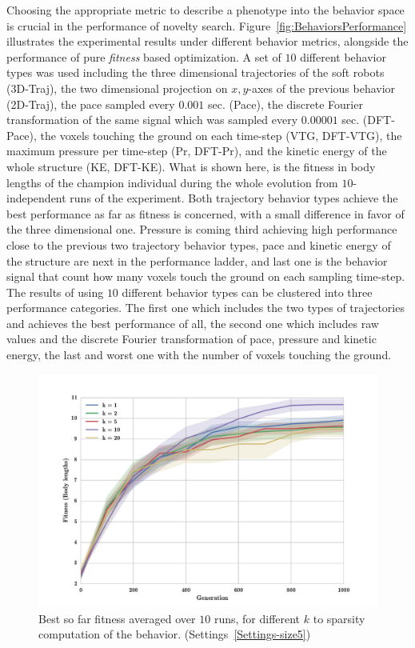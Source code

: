 Choosing the appropriate metric to describe a phenotype into the behavior space is crucial in the performance of novelty search. Figure~\ref{fig:BehaviorsPerformance} illustrates the experimental results under different behavior metrics, alongside the performance of pure \emph{fitness} based optimization. A set of $10$ different behavior types was used including the three dimensional trajectories of the soft robots (3D-Traj), the two dimensional projection on $x,y$-axes of the previous behavior (2D-Traj), the pace sampled every $0.001$ sec. (Pace), the discrete Fourier transformation of the same signal which was sampled every $0.00001$ sec. (DFT-Pace), the voxels touching the ground on each time-step (VTG, DFT-VTG), the maximum pressure per time-step (Pr, DFT-Pr), and the kinetic energy of the whole structure (KE, DFT-KE). What is shown here, is the fitness in body lengths of the champion individual during the whole evolution from $10$-independent runs of the experiment. Both trajectory behavior types achieve the best performance as far as fitness is concerned, with a small difference in favor of the three dimensional one. Pressure is coming third achieving high performance close to the previous two trajectory behavior types, pace and kinetic energy of the structure are next in the performance ladder, and last one is the behavior signal that count how many voxels touch the ground on each sampling time-step. The results of using $10$ different behavior types can be clustered into three performance categories. The first one which includes the two types of trajectories and achieves the best performance of all, the second one which includes raw values and the discrete Fourier transformation of pace, pressure and kinetic energy, the last and worst one with the number of voxels touching the ground. 

\begin{figure}[t!]
\centering
\includegraphics[width=1.0\textwidth]{../Figures/Results/KnnExperimentSize5.pdf}
\caption{Best so far fitness averaged over $10$ runs, for different $k$ to sparsity computation of the behavior. (Settings~\ref{Settings-size5})}
\label{fig:KnnExperimentSize5}
\end{figure}

